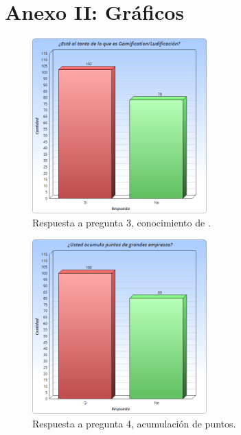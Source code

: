 \section{Anexo II: Gráficos }

\begin{figure}[!htb]
    \centering
    \includegraphics[width=0.6\textwidth]{images/Graficos/graf_5_1.png}
    \caption[Gráfico pregunta 3 de encuesta, conocimiento de {\gam}.]{Respuesta a pregunta $3$, conocimiento de {\gam}.}
    \label{fig:chart5.1}
\end{figure}

\begin{figure}[!htb]
    \centering
    \includegraphics[width=0.6\textwidth]{images/Graficos/graf_5_2.png}
    \caption[Gráfico pregunta 4, acumulación de puntos.]{Respuesta a pregunta 4, acumulación de puntos.}
    \label{fig:chart5.2}
\end{figure}

